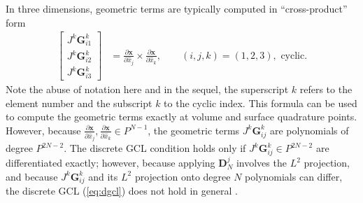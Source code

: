 \documentclass[preprint,10pt]{article}
\theoremstyle{definition}
\theoremstyle{lemma}
\theoremstyle{theorem}
\theoremstyle{assumption}
\renewcommand{\hat}{\widehat}
\newcommand{\pd}[2]{\frac{\partial#1}{\partial#2}}
\newcommand{\LRs}[1]{\left[ #1 \right]}
\begin{document}
{In three dimensions, geometric terms are typically computed in ``cross-product'' form
\begin{align}
\LRs{\begin{array}{c}
J^k\bm{G}^k_{i1}\\
J^k\bm{G}^k_{i2}\\
J^k\bm{G}^k_{i3}\end{array}} &= \pd{\bm{x}}{\hat{x}_j}\times \pd{\bm{x}}{\hat{x}_k}, \qquad (i,j,k) = (1,2,3), \text{ cyclic}.
\end{align}
Note the abuse of notation here and in the sequel, the superscript $k$ refers to the element number and the subscript $k$ to the cyclic index. 
This formula can be used to compute the geometric terms exactly at volume and surface quadrature points.  However, because $\pd{\bm{x}}{\hat{x}_j},\pd{\bm{x}}{\hat{x}_k} \in P^{N-1}$, the geometric terms $J^k\bm{G}^k_{ij}$ are polynomials of degree $P^{2N-2}$.  The discrete GCL condition holds only if $J^k\bm{G}^k_{ij} \in P^{2N-2}$ are differentiated exactly; however, because applying $\bm{D}^j_N$ involves the $L^2$ projection, and because $J^k\bm{G}^k_{ij}$ and its $L^2$ projection onto degree $N$ polynomials can differ, the discrete GCL (\ref{eq:dgcl}) does not hold in general \cite{kopriva2006metric}.  

}
\end{document}

